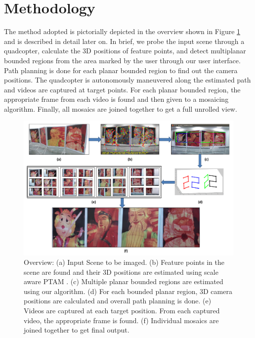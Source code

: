 



\section{Methodology}
The method adopted is pictorially depicted in the overview shown in Figure
\ref{fig:workflow} and is described in detail later on. In brief, we probe the
input scene through a quadcopter, calculate the 3D positions of feature points,
and detect multiplanar bounded regions from the area marked by the user through
our user interface. Path planning is done for each planar bounded region to find out
the camera positions. The quadcopter is autonomously maneuvered along the
estimated path and videos are captured at target points. For each planar
bounded region, the appropriate frame from each video is found and then given
to a mosaicing algorithm.  Finally, all mosaics are joined together to get a full
unrolled view.

\begin{figure}[ht!]
\centering
\includegraphics[width=\textwidth]{figures/multiplanar/workflow}
\caption[Overall Workflow]{Overview: (a) Input Scene to be imaged. (b) Feature
points in the scene are found and their 3D positions are estimated using scale aware PTAM \cite{engel}. (c) Multiple planar bounded
regions are estimated using our algorithm. (d) For each bounded planar region, 3D camera positions
are calculated and overall path planning is done. (e) Videos are captured at
each target position. From each captured video, the appropriate frame is
found. (f) Individual mosaics are joined together to get final output.}
\label{fig:workflow}
\end{figure}

